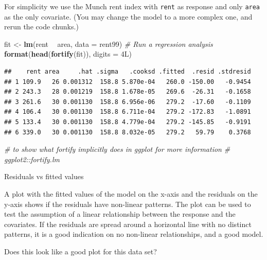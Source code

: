 \documentclass[10pt,ignorenonframetext,]{beamer}
\newenvironment{Shaded}{\begin{snugshade}}{\end{snugshade}}
\newcommand{\KeywordTok}[1]{\textcolor[rgb]{0.13,0.29,0.53}{\textbf{#1}}}
\newcommand{\DataTypeTok}[1]{\textcolor[rgb]{0.13,0.29,0.53}{#1}}
\newcommand{\StringTok}[1]{\textcolor[rgb]{0.31,0.60,0.02}{#1}}
\newcommand{\CommentTok}[1]{\textcolor[rgb]{0.56,0.35,0.01}{\textit{#1}}}
\newcommand{\OperatorTok}[1]{\textcolor[rgb]{0.81,0.36,0.00}{\textbf{#1}}}
\newcommand{\NormalTok}[1]{#1}
\begin{document}
\begin{frame}[fragile]

For simplicity we use the Munch rent index with \texttt{rent} as
response and only \texttt{area} as the only covariate. (You may change
the model to a more complex one, and rerun the code chunks.)

\footnotesize

\begin{Shaded}
\begin{Highlighting}[]
\NormalTok{fit <-}\StringTok{ }\KeywordTok{lm}\NormalTok{(rent }\OperatorTok{~}\StringTok{ }\NormalTok{area, }\DataTypeTok{data =}\NormalTok{ rent99)  }\CommentTok{# Run a regression analysis}
\KeywordTok{format}\NormalTok{(}\KeywordTok{head}\NormalTok{(}\KeywordTok{fortify}\NormalTok{(fit)), }\DataTypeTok{digits =}\NormalTok{ 4L)}
\end{Highlighting}
\end{Shaded}

\begin{verbatim}
##    rent area     .hat .sigma   .cooksd .fitted  .resid .stdresid
## 1 109.9   26 0.001312  158.8 5.870e-04   260.0 -150.00   -0.9454
## 2 243.3   28 0.001219  158.8 1.678e-05   269.6  -26.31   -0.1658
## 3 261.6   30 0.001130  158.8 6.956e-06   279.2  -17.60   -0.1109
## 4 106.4   30 0.001130  158.8 6.711e-04   279.2 -172.83   -1.0891
## 5 133.4   30 0.001130  158.8 4.779e-04   279.2 -145.85   -0.9191
## 6 339.0   30 0.001130  158.8 8.032e-05   279.2   59.79    0.3768
\end{verbatim}

\begin{Shaded}
\begin{Highlighting}[]
\CommentTok{# to show what fortify implicitly does in ggplot for more information}
\CommentTok{# ggplot2::fortify.lm}
\end{Highlighting}
\end{Shaded}

\normalsize

\end{frame}

\begin{frame}

\begin{block}{Residuals vs fitted values}

A plot with the fitted values of the model on the x-axis and the
residuals on the y-axis shows if the residuals have non-linear patterns.
The plot can be used to test the assumption of a linear relationship
between the response and the covariates. If the residuals are spread
around a horizontal line with no distinct patterns, it is a good
indication on no non-linear relationships, and a good model.

Does this look like a good plot for this data set?

\end{block}

\end{frame}
\end{document}
